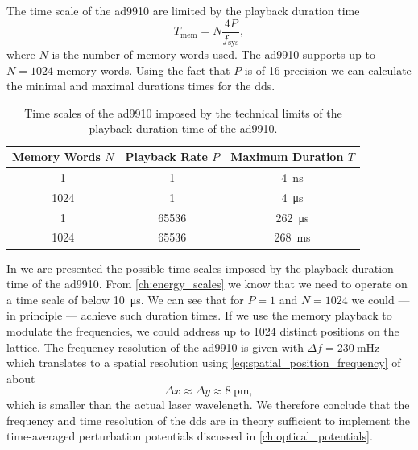 The time scale of the \gls{ad9910} are limited by the playback duration time
\begin{equation}
  T_\text{mem}
  =N\frac{4P}{f_\text{sys}}
  \label{eq:dds_playback_duration},
\end{equation}
where $N$ is the number of memory words used. The \gls{ad9910} supports up to
$N=1024$ memory words. Using the fact that $P$ is of \SI{16}{\bit} precision
we can calculate the minimal and maximal durations times for the \gls{dds}.
\begin{table}[htb]
  \centering
  \begin{tabular}{ccc}
    \toprule
    Memory Words $N$ & Playback Rate $P$ & Maximum Duration $T$ \\
    \midrule
    \num{1} & \num{1} & \SI{4}{\nano\second} \\
    \num{1024} & \num{1} & \SI{4}{\micro\second} \\
    \num{1} & \num{65536} & \SI{262}{\micro\second} \\
    \num{1024} & \num{65536} & \SI{268}{\milli\second} \\
    \bottomrule
  \end{tabular}
  \caption{Time scales of the \gls{ad9910} imposed by the technical limits of
    the playback duration time of the \gls{ad9910}.
  }\label{tab:dds_time_scale}
\end{table}
In  we are presented the possible time scales
imposed by the playback duration time of the \gls{ad9910}. From
\cref{ch:energy_scales} we know that we need to operate on a time scale of below
\SI{10}{\micro\second}. We can see that for $P=1$ and $N=1024$ we could --- in
principle --- achieve such duration times. If we use the memory playback to
modulate the frequencies, we could address up to \num{1024} distinct positions
on the lattice. The frequency resolution of the \gls{ad9910} is given with
$\Delta f=\SI{230}{\milli\hertz}$~\cite{AD9910} which translates to a spatial
resolution using \cref{eq:spatial_position_frequency} of about
\begin{equation}
  \Delta x\approx \Delta y\approx\SI{8}{\pico\meter}
  \label{eq:spatial_resolution},
\end{equation}
which is smaller than the actual laser wavelength. We therefore conclude that
the frequency and time resolution of the \gls{dds} are in theory sufficient
to implement the time-averaged perturbation potentials discussed in
\cref{ch:optical_potentials}.
